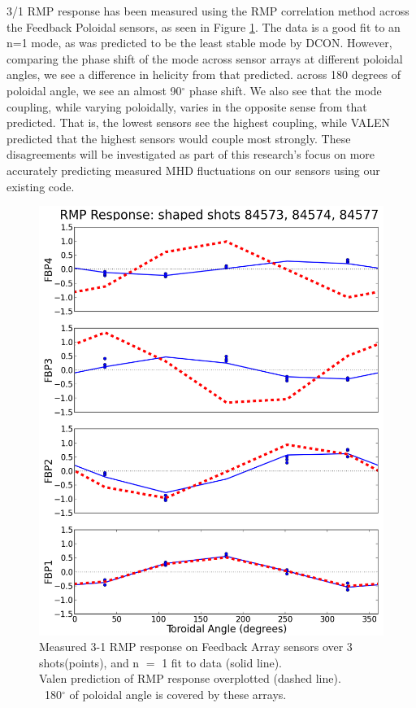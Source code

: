 \documentclass[aps,preprint,showpacs,superscriptaddress,groupedaddress]{revtex4}  %
\begin{document}
3/1 RMP response has been measured using the RMP correlation method across the Feedback Poloidal sensors, as seen in Figure \ref{RMP_response}.  The data is a good fit to an n=1 mode, as was predicted to be the least stable mode by DCON.  However, comparing the phase shift of the mode across sensor arrays at different poloidal angles, we see a difference in helicity from that predicted.  across 180 degrees of poloidal angle, we see an almost 90$^{\circ}$ phase shift.  We also see that the mode coupling, while varying poloidally, varies in the opposite sense from that predicted.  That is, the lowest sensors see the highest coupling, while VALEN predicted that the highest sensors would couple most strongly.  These disagreements will be investigated as part of this research's focus on more accurately predicting measured MHD fluctuations on our sensors using our existing code.
	
\begin{figure}[htb]
	\centering
\includegraphics[scale=.35]{../Plots/RMP_response_meas_vs_sim.png}\caption{Measured 3-1 RMP response on Feedback Array sensors over 3 shots(points), and n $=$ 1 fit to data (solid line).\\  Valen prediction of RMP response overplotted (dashed line).\\   ~180$^{\circ}$ of poloidal angle is covered by these arrays.}
	\label{RMP_response}
	\end{figure}
	
\end{document}
